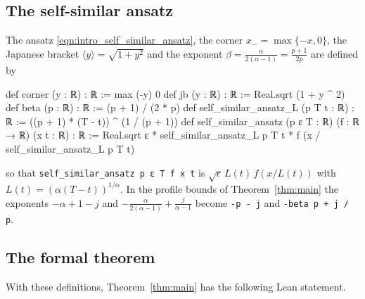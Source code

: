 \documentclass[11pt]{amsart}
\newcommand{\lean}{\lstinline[style=lean]}
\theoremstyle{definition}
\theoremstyle{remark}
\numberwithin{equation}{section}
\newcommand{\ang}[1]{\langle #1 \rangle}
\begin{document}
\subsection{The self-similar ansatz}\label{app:lean-ansatz}

The ansatz \eqref{eqn:intro_self_similar_ansatz}, the corner $x_-=\max\{-x,0\}$, the Japanese bracket $\ang{y}=\sqrt{1+y^2}$ and the exponent $\beta=\frac{\alpha}{2(\alpha-1)}=\frac{p+1}{2p}$ are defined by

\par
\noindent\begin{minipage}{\linewidth}
\begin{leancode}
def corner (y : ℝ) : ℝ := max (-y) 0
def jb (y : ℝ) : ℝ := Real.sqrt (1 + y ^ 2)
def beta (p : ℝ) : ℝ := (p + 1) / (2 * p)
def self_similar_ansatz_L (p T t : ℝ) : ℝ := ((p + 1) * (T - t)) ^ (1 / (p + 1))
def self_similar_ansatz (p ε T : ℝ) (f : ℝ → ℝ) (x t : ℝ) : ℝ :=
  Real.sqrt ε * self_similar_ansatz_L p T t * f (x / self_similar_ansatz_L p T t)
\end{leancode}
\end{minipage}
\par

so that \lean{self_similar_ansatz p ε T f x t} is $\sqrt\epsilon\,L(t)\,f(x/L(t))$ with $L(t)=(\alpha(T-t))^{1/\alpha}$. In the profile bounds of Theorem~\ref{thm:main} the exponents $-\alpha+1-j$ and $-\frac{\alpha}{2(\alpha-1)}+\frac{j}{\alpha-1}$ become \lean{-p - j} and \lean{-beta p + j / p}.

\subsection{The formal theorem}\label{app:lean-main}

With these definitions, Theorem~\ref{thm:main} has the following Lean statement.
\end{document}
